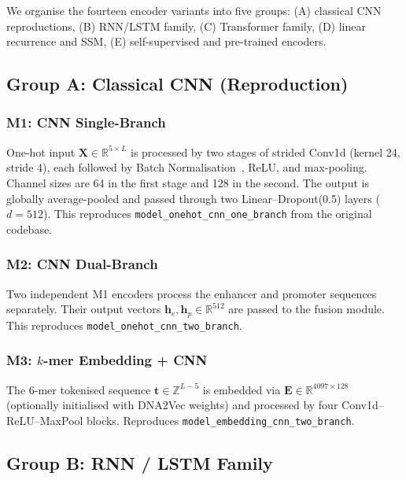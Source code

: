 We organise the fourteen encoder variants into five groups:
(A) classical CNN reproductions,
(B) RNN/LSTM family,
(C) Transformer family,
(D) linear recurrence and SSM,
(E) self-supervised and pre-trained encoders.

\subsection{Group A: Classical CNN (Reproduction)}

\subsubsection{M1: CNN Single-Branch}

One-hot input $\mathbf{X} \in \mathbb{R}^{5 \times L}$ is processed by two stages
of strided Conv1d (kernel 24, stride 4), each followed by Batch Normalisation~\cite{batch_norm},
ReLU, and max-pooling.
Channel sizes are 64 in the first stage and 128 in the second.
The output is globally average-pooled and passed through two Linear--Dropout(0.5) layers
($d = 512$).
This reproduces \texttt{model\_onehot\_cnn\_one\_branch} from the original codebase.

\subsubsection{M2: CNN Dual-Branch}

Two independent M1 encoders process the enhancer and promoter sequences separately.
Their output vectors $\mathbf{h}_e, \mathbf{h}_p \in \mathbb{R}^{512}$ are passed to
the fusion module.
This reproduces \texttt{model\_onehot\_cnn\_two\_branch}.

\subsubsection{M3: \texorpdfstring{$k$}{k}-mer Embedding + CNN}

The 6-mer tokenised sequence $\mathbf{t} \in \mathbb{Z}^{L-5}$ is embedded via
$\mathbf{E} \in \mathbb{R}^{4097 \times 128}$ (optionally initialised with DNA2Vec
weights) and processed by four Conv1d--ReLU--MaxPool blocks.
Reproduces \texttt{model\_embedding\_cnn\_two\_branch}.

\subsection{Group B: RNN / LSTM Family}

